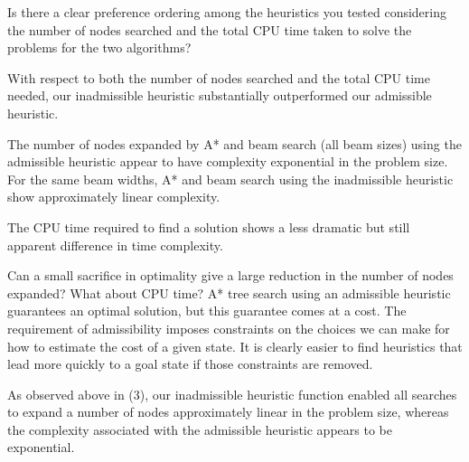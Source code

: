 \documentclass{article}
\newenvironment{Question}[2][Question]{\begin{trivlist}
\item[\hskip \labelsep {\bfseries #1}\hskip \labelsep {\bfseries #2.}]}{\end{trivlist}}
\begin{document}

\begin{Question}{3} Is there a clear preference ordering among the heuristics you tested considering the number of nodes searched and the total CPU time taken to solve the problems for the two algorithms?

With respect to both the number of nodes searched and the total CPU time needed, our inadmissible heuristic substantially outperformed our admissible heuristic. 

The number of nodes expanded by A* and beam search (all beam sizes) using the admissible heuristic appear to have complexity exponential in the problem size. For the same beam widths, A* and beam search using the inadmissible heuristic show approximately linear complexity.

The CPU time required to find a solution shows a less dramatic but still apparent difference in time complexity. 

\end{Question}


\begin{Question}{4}Can a small sacrifice in optimality give a large reduction in the number of nodes expanded? What about CPU time?
A* tree search using an admissible heuristic guarantees an optimal solution, but this guarantee comes at a cost. The requirement of admissibility imposes constraints on the choices we can make for how to estimate the cost of a given state. It is clearly easier to find heuristics that lead more quickly to a goal state if those constraints are removed.

As observed above in (3), our inadmissible heuristic function enabled all searches to expand a number of nodes approximately linear in the problem size, whereas the complexity associated with the admissible heuristic appears to be exponential. 

\end{Question}
\end{document}
